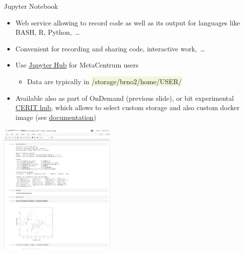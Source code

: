 \documentclass[compress, xelatex, 11pt, xcolor=svgnames, aspectratio=169,
	hyperref={
		bookmarks=true,
		unicode=true,
		colorlinks=true,
		pdftitle={Linux, command line and MetaCentrum},
		plainpages=false,
		pdfauthor={Vojtech Zeisek},
		pdfsubject={Course about use of Linux command line, writing shell scripts and using MetaCentrum of CESNET},
		pdfcreator={XeLaTeX},
		pdfkeywords={Linux, GNU, BASH, shell, command line, MetaCentrum},
		linkcolor=DarkRed, %
		anchorcolor=DarkBlue, %
		citecolor=Indigo, %
		filecolor=NavyBlue, %
		menucolor=DarkMagenta, %
		urlcolor=DarkBlue, %
		},
	url={hyphens, lowtilde} %
	]{beamer}
\renewcommand{\texttt}[1]{\colorbox{Beige}{{\ttfamily #1}}}
\begin{document}
\begin{frame}{Jupyter Notebook}
	\begin{multicols}{2}
		\begin{itemize}
			\item Web service allowing to record code as well as its output for languages like BASH, R, Python,~\ldots
			\item Convenient for recording and sharing code, interactive work,~\ldots
			\item Use \href{https://docs.metacentrum.cz/related/jupyter/}{Jupyter Hub} for MetaCentrum users
			\begin{itemize}
				\item Data are typically in \texttt{/storage/brno2/home/USER/}
			\end{itemize}
			\item Available also as part of OnDemand (previous slide), or bit experimental \href{https://hub.cloud.e-infra.cz/}{CERIT hub}, which allows to select custom storage and also custom docker image (see \href{https://docs.cerit.io/docs/jupyterhub.html}{documentation})
		\end{itemize}
		\begin{center}
			\includegraphics[height=6.5cm]{jupyter.png}
		\end{center}
	\end{multicols}
\end{frame}
\end{document}
